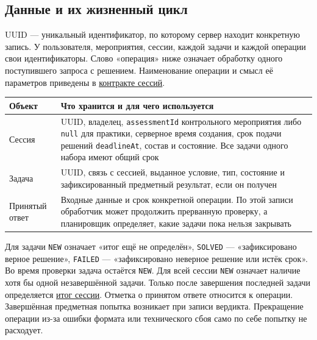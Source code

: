 \documentclass[12pt,a4paper]{article}
\begin{document}
\subsection{Данные и их жизненный цикл}\label{ux434ux430ux43dux43dux44bux435-ux438-ux438ux445-ux436ux438ux437ux43dux435ux43dux43dux44bux439-ux446ux438ux43aux43b}

\hypertarget{данные-и-их-жизненный-цикл}{}

UUID --- уникальный идентификатор, по которому сервер находит конкретную запись. У пользователя, мероприятия, сессии, каждой задачи и каждой операции свои идентификаторы. Слово «операция» ниже означает обработку одного поступившего запроса с решением. Наименование операции и смысл её параметров приведены в {\hyperlink{операции}{контракте сессий}}.

{\def\LTcaptype{none} %
\begin{longtable}[]{@{}
  >{\raggedright\arraybackslash}p{}
  >{\raggedright\arraybackslash}p{}@{}}
\toprule\noalign{}
\begin{minipage}[b]{\linewidth}\raggedright
Объект
\end{minipage} & \begin{minipage}[b]{\linewidth}\raggedright
Что хранится и для чего используется
\end{minipage} \\
\midrule\noalign{}
\endhead
\bottomrule\noalign{}
\endlastfoot
Сессия & UUID, владелец, \texttt{assessmentId} контрольного мероприятия либо \texttt{null} для практики, серверное время создания, срок подачи решений \texttt{deadlineAt}, состав и состояние. Все задачи одного набора имеют общий срок \\
Задача & UUID, связь с сессией, выданное условие, тип, состояние и зафиксированный предметный результат, если он получен \\
Принятый ответ & Входные данные и срок конкретной операции. По этой записи обработчик может продолжить прерванную проверку, а планировщик определяет, какие задачи пока нельзя закрывать \\
\end{longtable}
}

Для задачи \texttt{NEW} означает «итог ещё не определён», \texttt{SOLVED} --- «зафиксировано верное решение», \texttt{FAILED} --- «зафиксировано неверное решение или истёк срок». Во время проверки задача остаётся \texttt{NEW}. Для всей сессии \texttt{NEW} означает наличие хотя бы одной незавершённой задачи. Только после завершения последней задачи определяется {\hyperlink{swr-ses-018-общая-функция-итога-сессии}{итог сессии}}. Отметка о принятом ответе относится к операции. Завершённая предметная попытка возникает при записи вердикта. Прекращение операции из-за ошибки формата или технического сбоя само по себе попытку не расходует.
\end{document}
